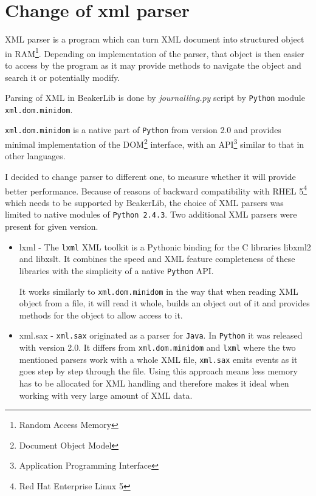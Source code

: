 \section{Change of xml parser}
XML parser is a program which can turn XML document into structured object in RAM\footnote{Random Access Memory}. Depending on implementation of the parser, that object is then easier to access by the program as it may provide methods to navigate the object and search it or potentially modify. 

Parsing of XML in BeakerLib is done by \textit{journalling.py} script by \texttt{Python} module \texttt{xml.dom.minidom}. 

 \texttt{xml.dom.minidom} is a native part of \texttt{Python} from version 2.0 and provides minimal implementation of the DOM\footnote{Document Object Model} interface, with an API\footnote{Application Programming Interface} similar to that in other languages. \cite{minidom_doc}

I decided to change parser to different one, to measure whether it will provide better performance. Because of reasons of backward compatibility with RHEL 5\footnote{Red Hat Enterprise Linux 5} which needs to be supported by BeakerLib, the choice of XML parsers was limited to native modules of \texttt{Python 2.4.3}. Two additional XML parsers were present for given version.

\begin{itemize}
\item lxml - The \texttt{lxml} XML toolkit is a Pythonic binding for the C libraries libxml2 and libxslt. It combines the speed and XML feature completeness of these libraries with the simplicity of a native \texttt{Python} API.  \cite{lxml_doc}

It works similarly to \texttt{xml.dom.minidom} in the way that when reading XML object from a file, it will read it whole, builds an object out of it and provides methods for the object to allow access to it.
\item xml.sax  \cite{sax_doc} - \texttt{xml.sax} originated as a parser for \texttt{Java}\cite{Sax2}. In \texttt{Python} it was released with version 2.0. It differs from \texttt{xml.dom.minidom} and \texttt{lxml} where the two mentioned parsers work with a whole XML file,  \texttt{xml.sax} emits events as it goes step by step through the file\cite{sax_example}. Using this approach means less memory has to be allocated for XML handling and therefore makes it ideal when working with very large amount of XML  data.
\end{itemize}

